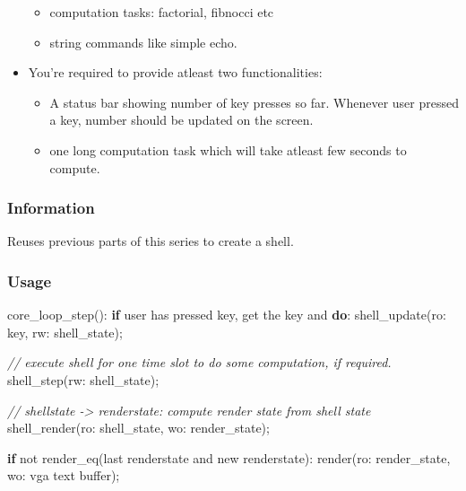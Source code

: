 \documentclass[]{book}
\newenvironment{Shaded}{}{}
\newcommand{\KeywordTok}[1]{\textbf{{#1}}}
\newcommand{\CommentTok}[1]{\textcolor[rgb]{0.50,0.50,0.50}{\textit{{#1}}}}
\newcommand{\NormalTok}[1]{{#1}}
\begin{document}
\begin{itemize}
  \begin{itemize}
  \itemsep1pt\parskip0pt
  \item
    computation tasks: factorial, fibnocci etc
  \item
    string commands like simple echo.
  \end{itemize}
\item
  You're required to provide atleast two functionalities:

  \begin{itemize}
  \itemsep1pt\parskip0pt
  \item
    A status bar showing number of key presses so far. Whenever user
    pressed a key, number should be updated on the screen.
  \item
    one long computation task which will take atleast few seconds to
    compute.
  \end{itemize}
\end{itemize}

\subsubsection*{Information}\label{information-3}

Reuses previous parts of this series to create a shell.

\subsubsection*{Usage}\label{usage-3}

\begin{Shaded}
\begin{Highlighting}[]
   \NormalTok{core_loop_step():}
       \KeywordTok{if} \NormalTok{user has pressed key, get the key and }\KeywordTok{do}\NormalTok{:}
           \NormalTok{shell_update(ro: key, rw: shell_state);}

       \CommentTok{// execute shell for one time slot to do some computation, if required.}
       \NormalTok{shell_step(rw: shell_state);}

       \CommentTok{// shellstate -> renderstate: compute render state from shell state}
       \NormalTok{shell_render(ro: shell_state, wo: render_state);}

       \KeywordTok{if} \NormalTok{not render_eq(last renderstate and new renderstate):}
           \NormalTok{render(ro: render_state, wo: vga text buffer);}
\end{Highlighting}
\end{Shaded}
\end{document}
